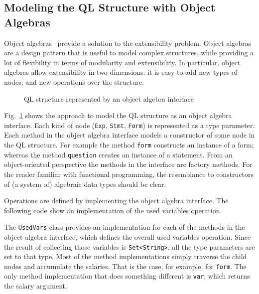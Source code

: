 \subsection{Modeling the QL Structure with Object Algebras}

Object algebras~\cite{bruno12oa} provide a solution to the extensibility problem.
Object algebras are a design pattern that is useful to model complex
structures, while providing a lot of flexibility in terms of
modularity and extensibility. In particular, object algebras allow
extensibility in two dimensions: it is easy to add new types of
nodes; and new operations over the structure.

\begin{figure}[t]
\nocaptionrule
\caption{QL structure represented by an object algebra interface}
\label{ql_tree}
\end{figure}

Fig.~\ref{ql_tree} shows the approach to model the QL
structure as an object algebra interface. Each kind of node (\lstinline{Exp}, \lstinline{Stmt}, \lstinline{Form})
is represented as a type parameter. Each method in the object algebra interface models a
constructor of some node in the QL structure. For example the
method \lstinline{form} constructs an instance of a form; whereas the
method \lstinline{question} creates an instance of a statement. From an
object-oriented perspective the methods in the interface are factory
methods. For the reader familiar with functional programming, the
resemblance to constructors of  (a system of) algebraic data types should be clear.

Operations are defined by implementing the object algebra interface.
The following code show an implementation of the used variables
operation.


The \lstinline{UsedVars} class provides an implementation for each
of the methods in the object algebra interface, which defines the
overall used variables operation. Since the result of collecting those
variables is \lstinline{Set<String>}, all the type parameters are set to
that type. Most of the method implementations simply traverse the
child nodes and accumulate the salaries. That is the case, for
example, for \lstinline{form}. The only method implementation that does
something different is \lstinline{var}, which returns the salary
argument.

